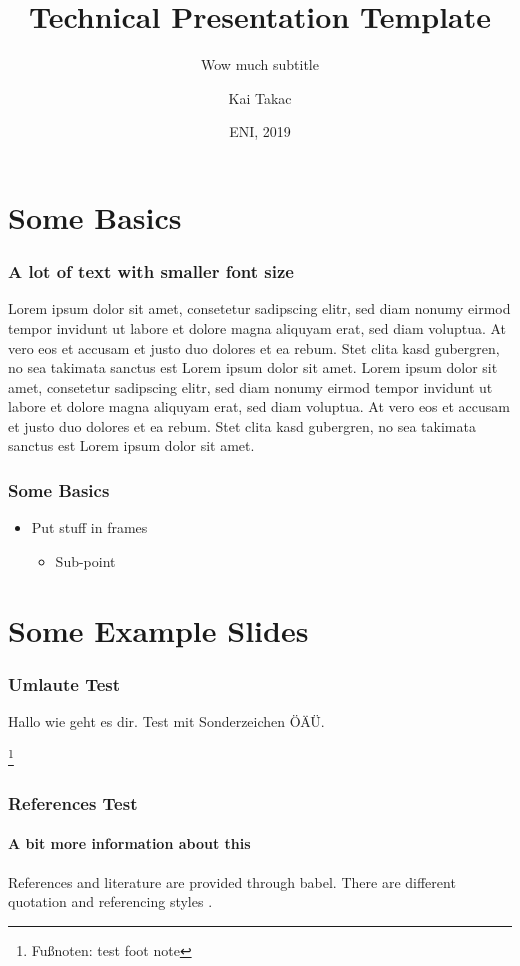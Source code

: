 \documentclass{technical_presentation}
\title{Technical Presentation Template}
\subtitle{Wow much subtitle}
\author{Kai Takac}
\date{ENI, 2019}
\begin{document}

\begin{frame}
	\titlepage
\end{frame}



\section{Some Basics}


\begin{frame}[shrink]
	\frametitle{A lot of text with smaller font size}
	Lorem ipsum dolor sit amet, consetetur sadipscing elitr, sed diam nonumy eirmod tempor invidunt ut labore et dolore magna aliquyam erat, sed diam voluptua. At vero eos et accusam et justo duo dolores et ea rebum. Stet clita kasd gubergren, no sea takimata sanctus est Lorem ipsum dolor sit amet. Lorem ipsum dolor sit amet, consetetur sadipscing elitr, sed diam nonumy eirmod tempor invidunt ut labore et dolore magna aliquyam erat, sed diam voluptua. At vero eos et accusam et justo duo dolores et ea rebum. Stet clita kasd gubergren, no sea takimata sanctus est Lorem ipsum dolor sit amet.
\end{frame}

\begin{frame}
	\frametitle{Some Basics}
	
	\begin{itemize}
		\item Put stuff in frames
		\begin{itemize}
			\item Sub-point
		\end{itemize}
	\end{itemize}
\end{frame}

\section{Some Example Slides}

\begin{frame} 
    \frametitle{Umlaute Test}
    Hallo wie geht es dir.
    Test mit Sonderzeichen ÖÄÜ.
    
    \footnote{Fußnoten: test foot note}
\end{frame}

\begin{frame}
    \frametitle{References Test}
    \framesubtitle{A bit more information about this}
    
    References and literature are provided through babel.
    There are different quotation and referencing styles \cite{hgb2019latex}.
\end{frame}
  
\end{document}
